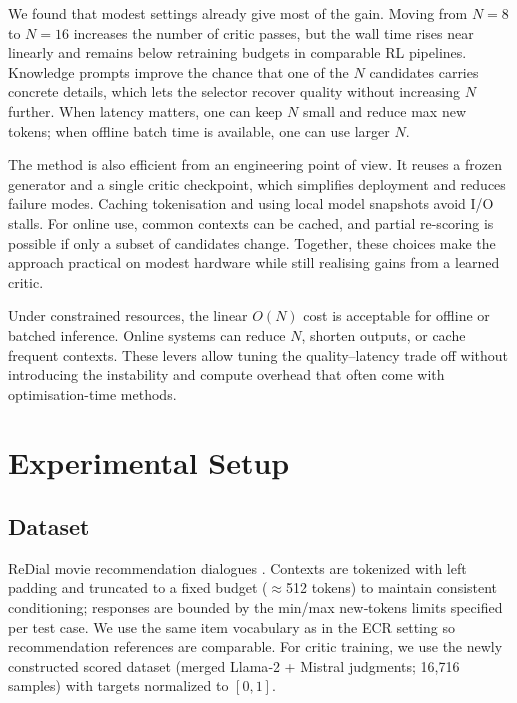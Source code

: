 \documentclass[12pt]{article}
\begin{document}
  We found that modest settings already give most of the gain. Moving from $N=8$ to $N=16$ increases the number of critic passes, but the wall time rises near linearly and remains below retraining budgets in comparable RL pipelines. Knowledge prompts improve the chance that one of the $N$ candidates carries concrete details, which lets the selector recover quality without increasing $N$ further. When latency matters, one can keep $N$ small and reduce max new tokens; when offline batch time is available, one can use larger $N$.
  
  The method is also efficient from an engineering point of view. It reuses a frozen generator and a single critic checkpoint, which simplifies deployment and reduces failure modes. Caching tokenisation and using local model snapshots avoid I/O stalls. For online use, common contexts can be cached, and partial re-scoring is possible if only a subset of candidates change. Together, these choices make the approach practical on modest hardware while still realising gains from a learned critic.
  
  Under constrained resources, the linear $O(N)$ cost is acceptable for offline or batched inference. Online systems can reduce $N$, shorten outputs, or cache frequent contexts. These levers allow tuning the quality–latency trade off without introducing the instability and compute overhead that often come with optimisation-time methods.

  \section{Experimental Setup}
  \subsection{Dataset}
  ReDial movie recommendation dialogues \citep{charlin2018redial}. Contexts are tokenized with left padding and truncated to a fixed budget (\(\approx\)512 tokens) to maintain consistent conditioning; responses are bounded by the min/max new‑tokens limits specified per test case. We use the same item vocabulary as in the ECR setting so recommendation references are comparable. For critic training, we use the newly constructed scored dataset (merged Llama‑2 + Mistral judgments; 16{,}716 samples) with targets normalized to $[0,1]$.
  
\end{document}
